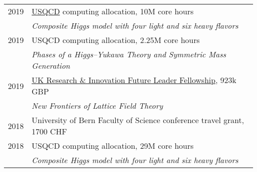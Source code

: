 \documentclass[10 pt]{article}
\begin{document}
\vspace{-12 pt} %
\begin{tabular}[t]{cl}
  2019 & \href{http://www.usqcd.org}{USQCD} computing allocation, 10M core hours                                                                                                                                                   \\ %
       & \textit{Composite Higgs model with four light and six heavy flavors}                                                                                                                                                      \\[6 pt]
  2019 & USQCD computing allocation, 2.25M core hours                                                                                                                                                                              \\ %
       & \textit{Phases of a Higgs--Yukawa Theory and Symmetric Mass Generation}                                                                                                                                                   \\[6 pt]
  2019 & \href{https://www.ukri.org/funding/funding-opportunities/future-leaders-fellowships/meet-our-future-leaders-fellows/david-schaich-university-of-liverpool/}{UK Research \& Innovation Future Leader Fellowship}, 923k GBP \\
       & \textit{New Frontiers of Lattice Field Theory}                                                                                                                                                                            \\[6 pt]
  2018 & University of Bern Faculty of Science conference travel grant, 1700 CHF                                                                                                                                                   \\[6 pt]
  2018 & USQCD computing allocation, 29M core hours                                                                                                                                                                                \\ %
       & \textit{Composite Higgs model with four light and six heavy flavors}                                                                                                                                                      \\[6 pt]

\end{tabular}
\end{document}
